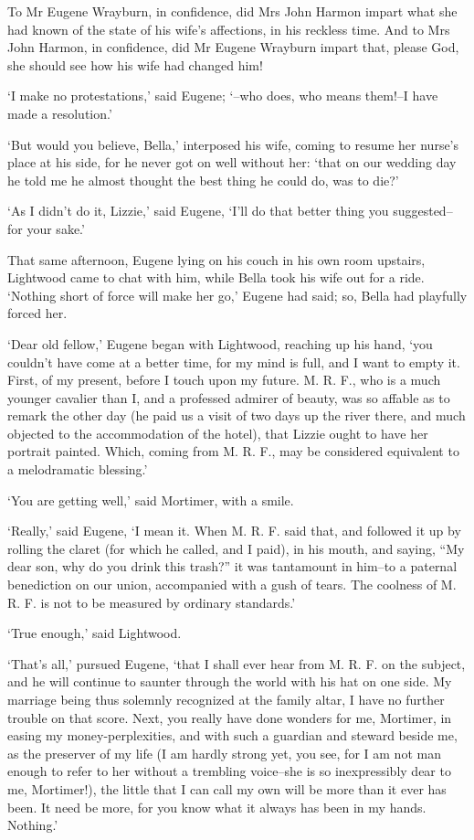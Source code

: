 To Mr Eugene Wrayburn, in confidence, did Mrs John Harmon impart what
she had known of the state of his wife’s affections, in his reckless
time. And to Mrs John Harmon, in confidence, did Mr Eugene Wrayburn
impart that, please God, she should see how his wife had changed him!

‘I make no protestations,’ said Eugene; ‘--who does, who means them!--I
have made a resolution.’

‘But would you believe, Bella,’ interposed his wife, coming to resume
her nurse’s place at his side, for he never got on well without her:
‘that on our wedding day he told me he almost thought the best thing he
could do, was to die?’

‘As I didn’t do it, Lizzie,’ said Eugene, ‘I’ll do that better thing you
suggested--for your sake.’

That same afternoon, Eugene lying on his couch in his own room upstairs,
Lightwood came to chat with him, while Bella took his wife out for a
ride. ‘Nothing short of force will make her go,’ Eugene had said; so,
Bella had playfully forced her.

‘Dear old fellow,’ Eugene began with Lightwood, reaching up his hand,
‘you couldn’t have come at a better time, for my mind is full, and I
want to empty it. First, of my present, before I touch upon my future.
M. R. F., who is a much younger cavalier than I, and a professed admirer
of beauty, was so affable as to remark the other day (he paid us a visit
of two days up the river there, and much objected to the accommodation
of the hotel), that Lizzie ought to have her portrait painted. Which,
coming from M. R. F., may be considered equivalent to a melodramatic
blessing.’

‘You are getting well,’ said Mortimer, with a smile.

‘Really,’ said Eugene, ‘I mean it. When M. R. F. said that, and followed
it up by rolling the claret (for which he called, and I paid), in his
mouth, and saying, “My dear son, why do you drink this trash?” it was
tantamount in him--to a paternal benediction on our union, accompanied
with a gush of tears. The coolness of M. R. F. is not to be measured by
ordinary standards.’

‘True enough,’ said Lightwood.

‘That’s all,’ pursued Eugene, ‘that I shall ever hear from M. R. F. on
the subject, and he will continue to saunter through the world with
his hat on one side. My marriage being thus solemnly recognized at the
family altar, I have no further trouble on that score. Next, you really
have done wonders for me, Mortimer, in easing my money-perplexities, and
with such a guardian and steward beside me, as the preserver of my life
(I am hardly strong yet, you see, for I am not man enough to refer
to her without a trembling voice--she is so inexpressibly dear to me,
Mortimer!), the little that I can call my own will be more than it ever
has been. It need be more, for you know what it always has been in my
hands. Nothing.’

